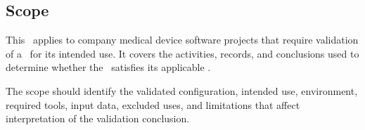 \subsection{Scope}
This \stdRptPkg\ applies to \Gls{company} medical device software projects that
require validation of a \stdCfgItem\ for its intended use.  It covers the
activities, records, and conclusions used to determine whether the \stdCfgItem\
satisfies its applicable \stdIUR.

\tlcVspace

The scope should identify the validated configuration, intended use,
environment, required tools, input data, excluded uses, and limitations that
affect interpretation of the validation conclusion.
